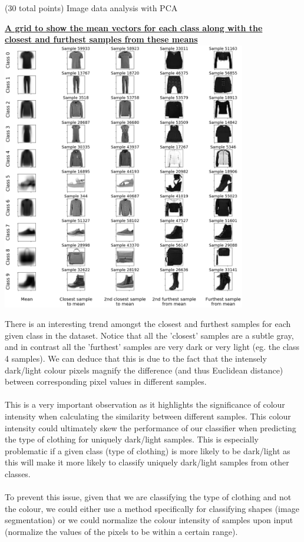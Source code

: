 \documentclass[12pt]{article}
\begin{document}
\begin{question}{(30 total points) Image data analysis with PCA}
\begin{subquestion}
  \begin{answerbox}{54em}
    \begin{center}
    \textbf{\underline{A grid to show the mean vectors for each class along with the}}\\
    \textbf{\underline{closest and furthest samples from these means}}
    \vspace{0.2cm}\\
    \includegraphics[width=0.8\textwidth]{images/q12.png}
    \end{center}
    \footnotesize{
    There is an interesting trend amongst the closest and furthest samples for each given class in the dataset. Notice that all the 'closest' samples are a subtle gray, and in contrast all the 'furthest' samples are very dark or very light (eg. the class 4 samples). We can deduce that this is due to the fact that the intensely dark/light colour pixels magnify the difference (and thus Euclidean distance) between corresponding pixel values in different samples.\\
\\
    This is a very important observation as it highlights the significance of colour intensity when calculating the similarity between different samples. This colour intensity could ultimately skew the performance of our classifier when predicting the type of clothing for uniquely dark/light samples. This is especially problematic if a given class (type of clothing) is more likely to be dark/light as this will make it more likely to classify uniquely dark/light samples from other classes.\\
\\
    To prevent this issue, given that we are classifying the type of clothing and not the colour, we could either use a method specifically for classifying shapes (image segmentation) or we could normalize the colour intensity of samples upon input (normalize the values of the pixels to be within a certain range).}
  \end{answerbox}




\end{subquestion}
\end{question}
\end{document}
